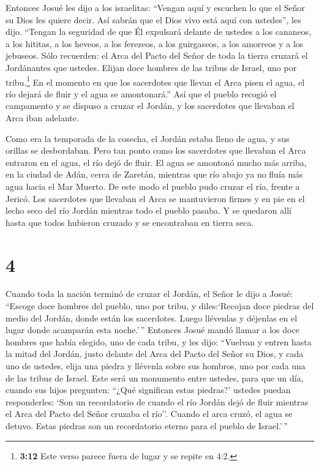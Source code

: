  Entonces Josué les dijo a los israelitas: ``Vengan aquí y
escuchen lo que el Señor su Dios les quiere decir.  Así
sabrán que el Dios vivo está aquí con ustedes'', les dijo. ``Tengan la
seguridad de que Él expulsará delante de ustedes a los cananeos, a los
hititas, a los heveos, a los ferezeos, a los guirgaseos, a los amorreos
y a los jebuseos.  Sólo recuerden: el Arca del Pacto del
Señor de toda la tierra cruzará el Jordánantes que ustedes.
 Elijan doce hombres de las tribus de Israel, uno por
tribu.\footnote{\textbf{3:12} Este verso parece fuera de lugar y se
  repite en 4:2.}  En el momento en que los sacerdotes que
llevan el Arca pisen el agua, el río dejará de fluir y el agua se
amontonará.''  Así que el pueblo recogió el campamento y se
dispuso a cruzar el Jordán, y los sacerdotes que llevaban el Arca iban
adelante.

 Como era la temporada de la cosecha, el Jordán estaba
lleno de agua, y sus orillas se desbordaban. Pero tan ponto como los
sacerdotes que llevaban el Arca entraron en el agua, el río dejó de
fluir.  El agua se amontonó mucho más arriba, en la ciudad
de Adán, cerca de Zaretán, mientras que río abajo ya no fluía más agua
hacia el Mar Muerto. De este modo el pueblo pudo cruzar el río, frente a
Jericó.  Los sacerdotes que llevaban el Arca se mantuvieron
firmes y en pie en el lecho seco del río Jordán mientras todo el pueblo
pasaba. Y se quedaron allí hasta que todos hubieron cruzado y se
encontraban en tierra seca.

\hypertarget{section-3}{%
\section{4}\label{section-3}}

 Cuando toda la nación terminó de cruzar el Jordán, el Señor
le dijo a Josué:  ``Escoge doce hombres del pueblo, uno por
tribu,  y diles:`Recojan doce piedras del medio del Jordán,
donde están los sacerdotes. Luego llévenlas y déjenlas en el lugar donde
acamparán esta noche.'\,''  Entonces Josué mandó llamar a
los doce hombres que había elegido, uno de cada tribu,  y
les dijo: ``Vuelvan y entren hasta la mitad del Jordán, justo delante
del Arca del Pacto del Señor su Dios, y cada uno de ustedes, elija una
piedra y llévenla sobre sus hombros, uno por cada una de las tribus de
Israel.  Este será un monumento entre ustedes, para que un
día, cuando sus hijos pregunten: ``¿Qué significan estas piedras?'
 ustedes puedan responderles: `Son un recordatorio de cuando
el río Jordán dejó de fluir mientras el Arca del Pacto del Señor cruzaba
el río''. Cuando el arca cruzó, el agua se detuvo. Estas piedras son un
recordatorio eterno para el pueblo de Israel.'\,''

